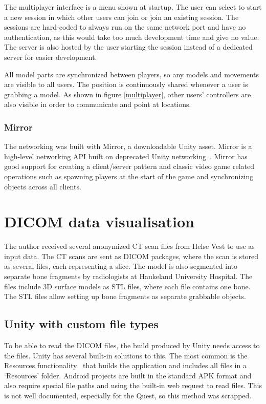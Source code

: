 \documentclass[a4paper]{report}
\begin{document}
The multiplayer interface is a menu shown at startup. The user can select to start a new session in which other users can join or join an existing session. The sessions are hard-coded to always run on the same network port and have no authentication, as this would take too much development time and give no value. The server is also hosted by the user starting the session instead of a dedicated server for easier development.

All model parts are synchronized between players, so any models and movements are visible to all users. The position is continuously shared whenever a user is grabbing a model. As shown in figure \ref{multiplayer}, other users' controllers are also visible in order to communicate and point at locations.


\subsubsection{Mirror}
The networking was built with Mirror, a downloadable Unity asset. Mirror is a high-level networking API built on deprecated Unity networking~\cite{noauthor_mirror_nodate}. Mirror has good support for creating a client/server pattern and classic video game related operations such as spawning players at the start of the game and synchronizing objects across all clients.

\section{DICOM data visualisation}
The author received several anonymized CT scan files from Helse Vest to use as input data. The CT scans are sent as DICOM packages, where the scan is stored as several files, each representing a slice.
The model is also segmented into separate bone fragments by radiologists at Haukeland University Hospital. The files include 3D surface models as STL files, where each file contains one bone. The STL files allow setting up bone fragments as separate grabbable objects.


\subsection{Unity with custom file types}

To be able to read the DICOM files, the build produced by Unity needs access to the files. Unity has several built-in solutions to this.
The most common is the Resources functionality~\cite{resourcesload_unity_nodate} that builds the application and includes all files in a `Resources' folder. Android projects are built in the standard APK format and also require special file paths and using the built-in web request to read files. This is not well documented, especially for the Quest, so this method was scrapped.
\end{document}
